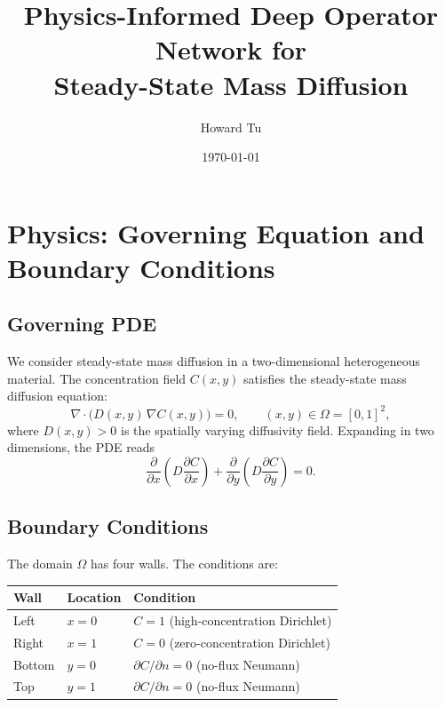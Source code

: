 \documentclass[11pt]{article}
\title{Physics-Informed Deep Operator Network for\\Steady-State Mass Diffusion}
\author{Howard Tu}
\date{\today}
\begin{document}
\maketitle
\tableofcontents
\bigskip

\section{Physics: Governing Equation and Boundary Conditions}

\subsection{Governing PDE}

We consider steady-state mass diffusion in a two-dimensional heterogeneous
material.  The concentration field $C(x,y)$ satisfies the steady-state
mass diffusion equation:
\begin{equation}
  \nabla \cdot \bigl( D(x,y)\,\nabla C(x,y) \bigr) = 0,
  \qquad (x,y) \in \Omega = [0,1]^2,
  \label{eq:massdiff}
\end{equation}
where $D(x,y) > 0$ is the spatially varying diffusivity field.
Expanding in two dimensions, the PDE reads
\begin{equation}
  \frac{\partial}{\partial x}\!\left(D\frac{\partial C}{\partial x}\right)
  +
  \frac{\partial}{\partial y}\!\left(D\frac{\partial C}{\partial y}\right)
  = 0.
\end{equation}

\subsection{Boundary Conditions}

The domain $\Omega$ has four walls.  The conditions are:

\begin{center}
\begin{tabular}{lll}
  \toprule
  Wall & Location & Condition \\
  \midrule
  Left  & $x = 0$ & $C = 1$ \quad (high-concentration Dirichlet) \\
  Right & $x = 1$ & $C = 0$ \quad (zero-concentration Dirichlet) \\
  Bottom & $y = 0$ & $\partial C/\partial n = 0$ \quad (no-flux Neumann) \\
  Top   & $y = 1$ & $\partial C/\partial n = 0$ \quad (no-flux Neumann) \\
  \bottomrule
\end{tabular}
\end{center}
\end{document}

